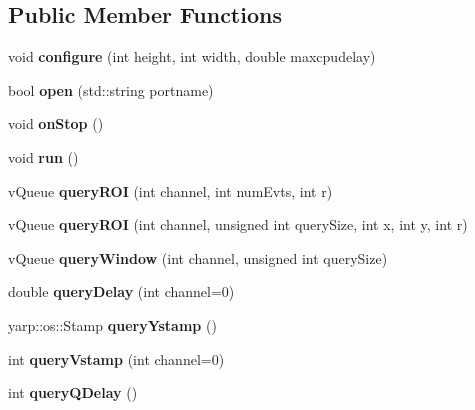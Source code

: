 \subsection*{Public Member Functions}
\begin{DoxyCompactItemize}
\item 
\mbox{\label{classev_1_1hSurfThread_a17acb3eb05f063ab81ab5128986ed7c8}} 
void {\bfseries configure} (int height, int width, double maxcpudelay)
\item 
\mbox{\label{classev_1_1hSurfThread_afa2fc93ae2c64231e566738ebfddabf1}} 
bool {\bfseries open} (std\+::string portname)
\item 
\mbox{\label{classev_1_1hSurfThread_a7897b02f77738563c0d2fd5123dc4c51}} 
void {\bfseries on\+Stop} ()
\item 
\mbox{\label{classev_1_1hSurfThread_af4a0a8b35321419785dce1b94e43e5e3}} 
void {\bfseries run} ()
\item 
\mbox{\label{classev_1_1hSurfThread_a469e52e39fe123a6699171e504cf0e78}} 
v\+Queue {\bfseries query\+R\+OI} (int channel, int num\+Evts, int r)
\item 
\mbox{\label{classev_1_1hSurfThread_ada4a11e319f5f0122897e21d6411bb1a}} 
v\+Queue {\bfseries query\+R\+OI} (int channel, unsigned int query\+Size, int x, int y, int r)
\item 
\mbox{\label{classev_1_1hSurfThread_a89e485321978fdf785ba0e4e3b08a7ec}} 
v\+Queue {\bfseries query\+Window} (int channel, unsigned int query\+Size)
\item 
\mbox{\label{classev_1_1hSurfThread_ae50c10e866f8692aae342d75e38369e7}} 
double {\bfseries query\+Delay} (int channel=0)
\item 
\mbox{\label{classev_1_1hSurfThread_a02f2a70c6f8147e70e1689520555c389}} 
yarp\+::os\+::\+Stamp {\bfseries query\+Ystamp} ()
\item 
\mbox{\label{classev_1_1hSurfThread_af5da61e8087f133f2202c873660779bc}} 
int {\bfseries query\+Vstamp} (int channel=0)
\item 
\mbox{\label{classev_1_1hSurfThread_a92089f336c6298e58440cee7f3b2eb07}} 
int {\bfseries query\+Q\+Delay} ()
\end{DoxyCompactItemize}


